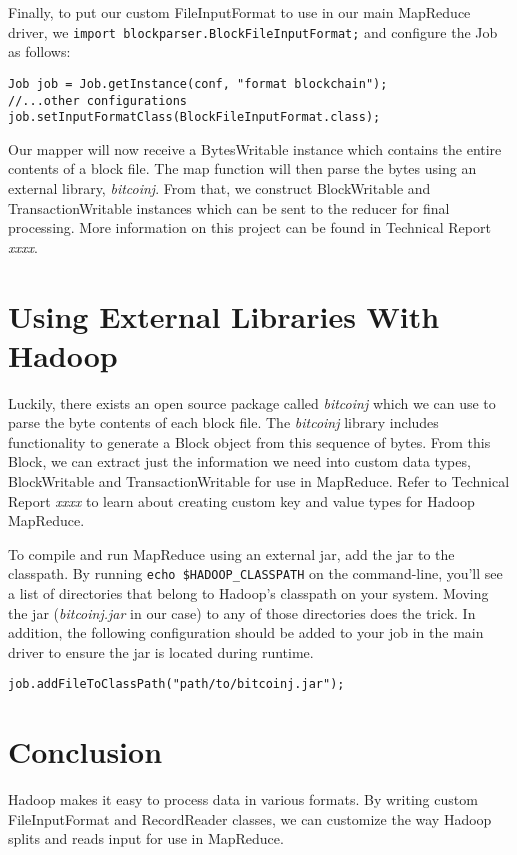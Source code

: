 \documentclass[9pt,twocolumn,twoside]{idsi}
\begin{document}
Finally, to put our custom FileInputFormat to use in our main MapReduce driver, we \lstinline{import blockparser.BlockFileInputFormat;} and configure the Job as follows:

\begin{lstlisting}
Job job = Job.getInstance(conf, "format blockchain");
//...other configurations
job.setInputFormatClass(BlockFileInputFormat.class);
\end{lstlisting}

Our mapper will now receive a BytesWritable instance which contains the entire contents of a block file. The map function will then parse the bytes using an external library, \emph{bitcoinj}. From that, we construct BlockWritable and TransactionWritable instances which can be sent to the reducer for final processing. More information on this project can be found in Technical Report \emph{xxxx}.

\section{Using External Libraries With Hadoop}

Luckily, there exists an open source package called \emph{bitcoinj} which we can use to parse the byte contents of each block file. The \emph{bitcoinj} library includes functionality to generate a Block object from this sequence of bytes. From this Block, we can extract just the information we need into custom data types, BlockWritable and TransactionWritable for use in MapReduce. Refer to Technical Report \emph{xxxx} to learn about creating custom key and value types for Hadoop MapReduce.

To compile and run MapReduce using an external jar, add the jar to the classpath. By running \lstinline{echo $HADOOP_CLASSPATH} on the command-line, you'll see a list of directories that belong to Hadoop's classpath on your system. Moving the jar (\emph{bitcoinj.jar} in our case) to any of those directories does the trick. In addition, the following configuration should be added to your job in the main driver to ensure the jar is located during runtime.

\begin{lstlisting}
job.addFileToClassPath("path/to/bitcoinj.jar");
\end{lstlisting}

\section{Conclusion}
Hadoop makes it easy to process data in various formats. By writing custom FileInputFormat and RecordReader classes, we can customize the way Hadoop splits and reads input for use in MapReduce.
\end{document}
